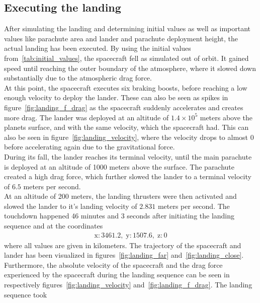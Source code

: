 \documentclass[reprint,english,notitlepage]{revtex4-2}
\begin{document}
\subsection{Executing the landing}\label{subsec:executing-the-landing}
    After simulating the landing and determining initial values as well as important values like parachute area and lander and parachute deployment height, the actual landing has been executed.
    By using the initial values from~\ref{tab:initial_values}, the spacecraft fell as simulated out of orbit.
    It gained speed until reaching the outer boundary of the atmosphere, where it slowed down substantially due to the atmospheric drag force.\\
    At this point, the spacecraft executes six braking boosts, before reaching a low enough velocity to deploy the lander.
    These can also be seen as spikes in figure~\ref{fig:landing_f_drag} as the spacecraft suddenly accelerates and creates more drag.
    The lander was deployed at an altitude of $1.4 \times 10^5$ meters above the planets surface, and with the same velocity, which the spacecraft had.
    This can also be seen in figure~\ref{fig:landing_velocity}, where the velocity drops to almost 0 before accelerating again due to the gravitational force.\\
    During its fall, the lander reaches its terminal velocity, until the main parachute is deployed at an altitude of 1000 meters above the surface.
    The parachute created a high drag force, which further slowed the lander to a terminal velocity of $6.5$ meters per second.\\
    At an altitude of 200 meters, the landing thrusters were then activated and slowed the lander to it's landing velocity of $2.831$ meters per second.
    The touchdown happened 46 minutes and 3 seconds after initiating the landing sequence and at the coordinates
    \begin{align*}
    \text{x}: 3461.2, \;\text{y}: 1507.6, \;\text{z}: 0
    \end{align*}
    where all values are given in kilometers.
    The trajectory of the spacecraft and lander has been visualized in figures~\ref{fig:landing_far} and~\ref{fig:landing_close}.
    Furthermore, the absolute velocity of the spacecraft and the drag force experienced by the spacecraft during the landing sequence can be seen in respectively figures~\ref{fig:landing_velocity} and~\ref{fig:landing_f_drag}.
    The landing sequence took
\end{document}
